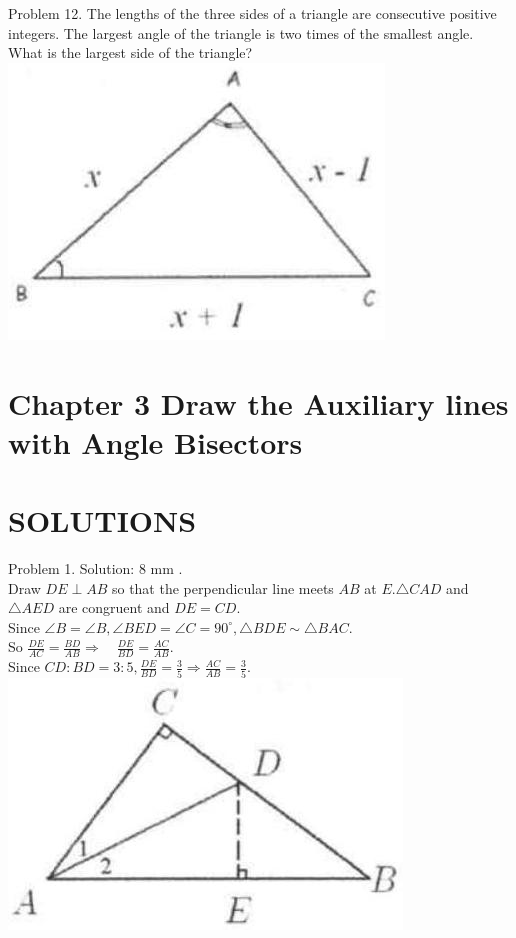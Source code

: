\documentclass[10pt]{article}
\begin{document}
Problem 12. The lengths of the three sides of a triangle are consecutive positive integers. The largest angle of the triangle is two times of the smallest angle. What is the largest side of the triangle?\\
\includegraphics[max width=\textwidth, center]{2025_04_17_97bc1f7e44d93c271a88g-066(3)}

\section*{Chapter 3 Draw the Auxiliary lines with Angle Bisectors}
\section*{SOLUTIONS}
Problem 1. Solution: 8 mm .\\
Draw \(D E \perp A B\) so that the perpendicular line meets \(A B\) at \(E . \triangle C A D\) and \(\triangle A E D\) are congruent and \(D E=C D\).\\
Since \(\angle B=\angle B, \angle B E D=\angle C=90^{\circ}, \triangle B D E \sim \triangle B A C\).\\
So \(\frac{D E}{A C}=\frac{B D}{A B} \Rightarrow \quad \frac{D E}{B D}=\frac{A C}{A B}\).\\
Since \(C D: B D=3: 5, \frac{D E}{B D}=\frac{3}{5} \Rightarrow \frac{A C}{A B}=\frac{3}{5}\).\\
\includegraphics[max width=\textwidth, center]{2025_04_17_97bc1f7e44d93c271a88g-067}
\end{document}
